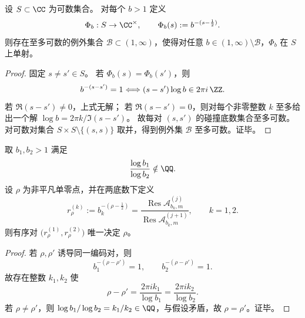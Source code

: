 \begin{theorem}[单基去混叠的可数例外集定理]\label{thm:xi-single-base-dealiasing-countable-exception}
设 \(S\subset\CC\) 为可数集合。
对每个 \(b>1\) 定义
\[
\Phi_b:S\to\CC^\times,\qquad
\Phi_b(s):=b^{-(s-\frac12)}.
\]
则存在至多可数的例外集合 \(\mathcal B\subset(1,\infty)\)，使得对任意
\(
b\in(1,\infty)\setminus\mathcal B
\)，\(\Phi_b\) 在 \(S\) 上单射。
\end{theorem}

\begin{proof}
固定 \(s\neq s'\in S\)。
若 \(\Phi_b(s)=\Phi_b(s')\)，则
\[
b^{-(s-s')}=1
\Longleftrightarrow
(s-s')\log b\in 2\pi i\,\ZZ.
\]
若 \(\Re(s-s')\neq 0\)，上式无解；
若 \(\Re(s-s')=0\)，则对每个非零整数 \(k\) 至多给出一个解
\(
\log b=2\pi k/\Im(s-s')
\)。
故每对 \((s,s')\) 的碰撞底数集合至多可数。
对可数对集合 \(S\times S\setminus\{(s,s)\}\) 取并，得到例外集 \(\mathcal B\) 至多可数。证毕。
\end{proof}

\begin{theorem}[双基残差比编码的唯一重构]\label{thm:xi-two-base-residue-ratio-unique-recovery}
取 \(b_1,b_2>1\) 满足
\[
\frac{\log b_1}{\log b_2}\notin\QQ.
\]
设 \(\rho\) 为非平凡单零点，并在两底数下定义
\[
r_\rho^{(k)}
:=b_k^{-(\rho-\frac12)}
=\frac{\operatorname{Res}\mathcal A_{b_k,m}^{(j)}}
{\operatorname{Res}\mathcal A_{b_k,m}^{(j+1)}},
\qquad k=1,2.
\]
则有序对 \(\bigl(r_\rho^{(1)},r_\rho^{(2)}\bigr)\) 唯一决定 \(\rho\)。
\end{theorem}

\begin{proof}
若 \(\rho,\rho'\) 诱导同一编码对，则
\[
b_1^{-(\rho-\rho')}=1,\qquad b_2^{-(\rho-\rho')}=1.
\]
故存在整数 \(k_1,k_2\) 使
\[
\rho-\rho'=\frac{2\pi i k_1}{\log b_1}
=\frac{2\pi i k_2}{\log b_2}.
\]
若 \(\rho\neq\rho'\)，则
\(
\log b_1/\log b_2=k_1/k_2\in\QQ
\)，与假设矛盾，故 \(\rho=\rho'\)。证毕。
\end{proof}

